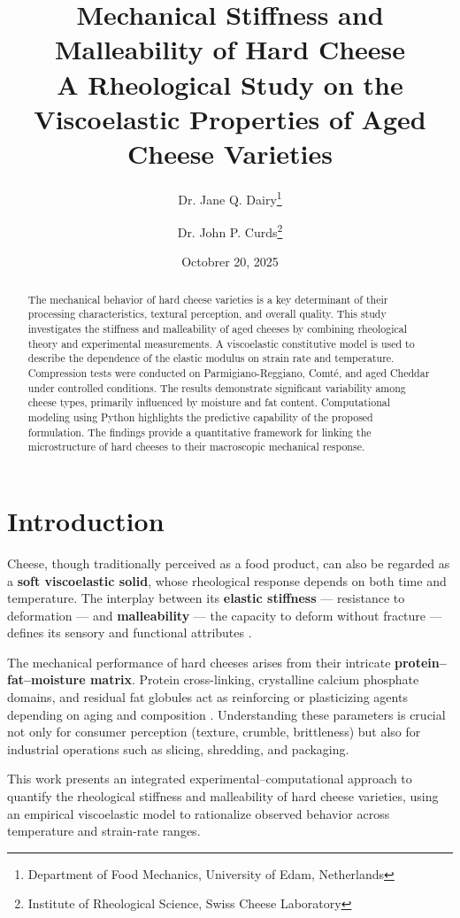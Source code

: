 \documentclass[a4paper,twoside]{article}
\title{Mechanical Stiffness and Malleability of Hard Cheese\\[0.5em]\large A Rheological Study on the Viscoelastic Properties of Aged Cheese Varieties}
\author{Dr. Jane Q. Dairy\thanks{Department of Food Mechanics, University of Edam, Netherlands} \and Dr. John P. Curds\thanks{Institute of Rheological Science, Swiss Cheese Laboratory}}\date{Octobrer 20, 2025}
\begin{document}
\maketitle
\begin{abstract}
The mechanical behavior of hard cheese varieties is a key determinant of their
processing characteristics, textural perception, and overall quality. This study
investigates the stiffness and malleability of aged cheeses by combining
rheological theory and experimental measurements. A viscoelastic constitutive
model is used to describe the dependence of the elastic modulus on strain rate
and temperature. Compression tests were conducted on Parmigiano-Reggiano, Comté,
and aged Cheddar under controlled conditions. The results demonstrate significant
variability among cheese types, primarily influenced by moisture and fat content.
Computational modeling using Python highlights the predictive capability of the
proposed formulation. The findings provide a quantitative framework for linking
the microstructure of hard cheeses to their macroscopic mechanical response.

\end{abstract}

\thispagestyle{plain}
\section{Introduction}\label{introduction}

Cheese, though traditionally perceived as a food product, can also be regarded
as a \textbf{soft viscoelastic solid}, whose rheological response depends on both time
and temperature. The interplay between its \textbf{elastic stiffness} --- resistance
to deformation --- and \textbf{malleability} --- the capacity to deform without
fracture --- defines its sensory and functional attributes \cite{Prentice1993}.

The mechanical performance of hard cheeses arises from their intricate
\textbf{protein--fat--moisture matrix}. Protein cross-linking, crystalline calcium
phosphate domains, and residual fat globules act as reinforcing or plasticizing
agents depending on aging and composition \cite{Jaoac2019}. Understanding these
parameters is crucial not only for consumer perception (texture, crumble,
brittleness) but also for industrial operations such as slicing, shredding,
and packaging.

This work presents an integrated experimental--computational approach to quantify
the rheological stiffness and malleability of hard cheese varieties, using an
empirical viscoelastic model to rationalize observed behavior across temperature
and strain-rate ranges.
\end{document}
